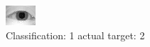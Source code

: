 \begin{figure}[h!]
\begin{center}
\includegraphics[width=0.60\columnwidth]{figures/ID865_class_1_target_2.png}
\end{center}
\caption{ Classification: 1 actual target: 2}
\label{fig:ID865_class_1_target_2}
\end{figure}

